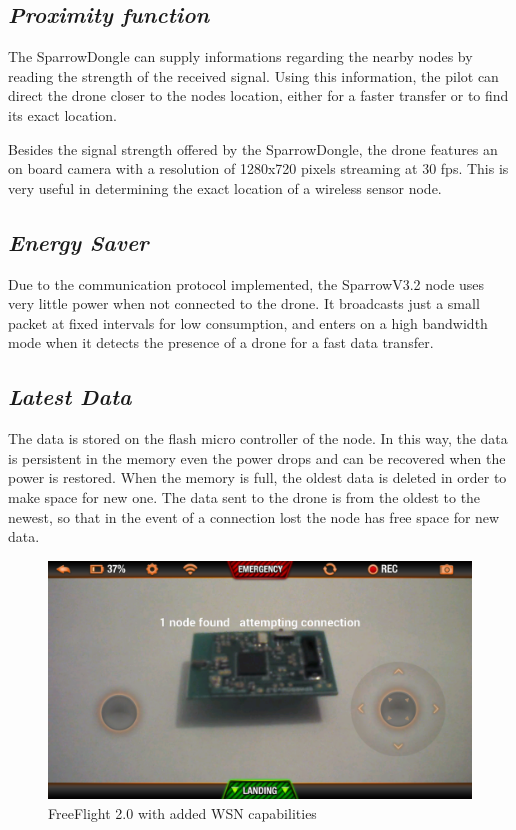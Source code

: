 \subsection{\textit{Proximity function}} 

\label{sec:prox}

The SparrowDongle can supply informations regarding the nearby nodes by reading the strength of the received signal. Using this information, the pilot can direct the drone closer to the nodes location, either for a faster transfer or to find its exact location\cite{yedavalli2005ecolocation}. 

Besides the signal strength offered by the SparrowDongle, the drone features an on board camera with a resolution of 1280x720 pixels streaming at 30 fps. This is very useful in determining the exact location of a wireless sensor node.


\subsection{\textit{Energy Saver}} 

\label{sec:eng}

Due to the communication protocol implemented, the SparrowV3.2 node uses very little power when not connected to the drone. It broadcasts just a small packet at fixed intervals for low consumption, and enters on a high bandwidth mode when it detects the presence of a drone for a fast data transfer.\cite{cardei2005improving}


\subsection{\textit{Latest Data}} 

\label{sec:data}

The data is stored on the flash micro controller of the node. In this way, the data is persistent in the memory even the power drops and can be recovered when the power is restored. When the memory is full, the oldest data is deleted in order to make space for new one. The data sent to the drone is from the oldest to the newest, so that in the event of a connection lost the node has free space for new data. 


\begin{figure}[ht] \centering
\includegraphics[width=1\textwidth]{img/app.png}
\caption{FreeFlight 2.0 with added WSN capabilities } \end{figure}
 



